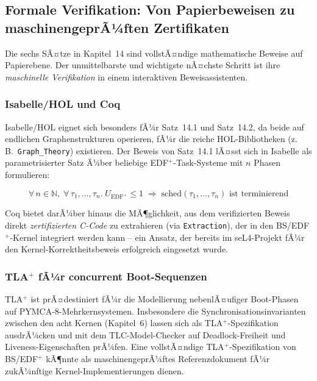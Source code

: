 ﻿\documentclass[a4paper,12pt]{scrreprt}
\theoremstyle{definition}
\begin{document}
	\subsection{Formale Verifikation: Von Papierbeweisen zu maschinengeprÃ¼ften Zertifikaten}
	
	Die sechs SÃ¤tze in Kapitel~14 sind vollstÃ¤ndige mathematische Beweise auf
	Papierebene. Der unmittelbarste und wichtigste nÃ¤chste Schritt ist ihre
	\emph{maschinelle Verifikation} in einem interaktiven Beweisassistenten.
	
	\subsubsection{Isabelle/HOL und Coq}
	
	Isabelle/HOL \cite{Nipkow2002} eignet sich besonders fÃ¼r Satz~14.1 und
	Satz~14.2, da beide auf endlichen Graphenstrukturen operieren, fÃ¼r die
	reiche HOL-Bibliotheken (z.\,B.\ \texttt{Graph\_Theory}) existieren.
	Der Beweis von Satz~14.1 lÃ¤sst sich in Isabelle als parametrisierter
	Satz Ã¼ber beliebige EDF$^+$-Task-Systeme mit $n$ Phasen formulieren:
	
	\[
	\forall\, n \in \mathbb{N},\; \forall\,\tau_1,\ldots,\tau_n.\;
	U_{\mathrm{EDF}^+} \le 1 \;\Longrightarrow\;
	\text{sched}(\tau_1,\ldots,\tau_n) \text{ ist terminierend}
	\]
	
	Coq bietet darÃ¼ber hinaus die MÃ¶glichkeit, aus dem verifizierten Beweis
	direkt \emph{zertifizierten C-Code} zu extrahieren (via \texttt{Extraction}),
	der in den BS/EDF$^+$-Kernel integriert werden kann -- ein Ansatz, der
	bereits im seL4-Projekt \cite{Klein2009} fÃ¼r den Kernel-Korrektheitsbeweis
	erfolgreich eingesetzt wurde.
	
	\subsubsection{TLA\texorpdfstring{$^+$}{+} fÃ¼r concurrent Boot-Sequenzen}
	
	TLA$^+$ \cite{Lamport2002} ist prÃ¤destiniert fÃ¼r die Modellierung
	nebenlÃ¤ufiger Boot-Phasen auf PYMCA-8-Mehrkern\-systemen. Insbesondere
	die Synchronisationsinvarianten zwischen den acht Kernen (Kapitel~6) lassen
	sich als TLA$^+$-Spezifikation ausdrÃ¼cken und mit dem TLC-Model-Checker
	auf Deadlock-Freiheit und Liveness-Eigenschaften prÃ¼fen. Eine vollstÃ¤ndige
	TLA$^+$-Spezifikation von BS/EDF$^+$ kÃ¶nnte als maschinengeprÃ¼ftes
	Referenzdokument fÃ¼r zukÃ¼nftige Kernel-Implementierungen dienen.
	
\end{document}
